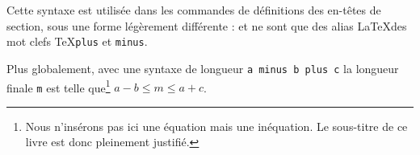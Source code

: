 \begin{latexcode}
\vspace{2.5cm minus 1.5cm plus 0.5cm}
\end{latexcode}

Cette syntaxe est utilisée dans les commandes de définitions des en-têtes de section, sous une forme légèrement différente :  et  ne sont que des alias \LaTeX des mot clefs \TeX \verb|plus| et \verb|minus|.

Plus globalement, avec une syntaxe de longueur \verb|a minus b plus c| la longueur finale \verb|m| est telle que\footnote{Nous n'insérons pas ici une équation mais une inéquation. Le sous-titre de ce livre est donc pleinement justifié.} $ a - b \leq m \leq a + c $.  

